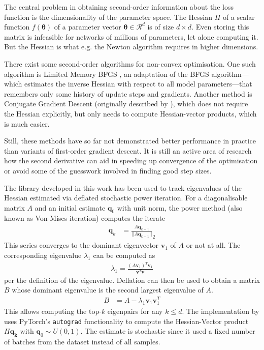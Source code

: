 The central problem in obtaining second-order information about the loss
function is the dimensionality of the parameter space. The Hessian $H$ of a
scalar function $f(\boldsymbol{\theta})$ of a parameter vector $\boldsymbol{\theta} \in
\mathcal{R}^d$ is of size $d\times d$. Even storing this matrix is infeasible
for networks of millions of parameters, let alone computing it.
But the Hessian is what e.g. the Newton algorithm requires in higher dimensions.

There exist some second-order algorithms for non-convex optimisation.  One such
algorithm is Limited Memory BFGS \citep{liu1989limited}, an adaptation of the
BFGS algorithm---which estimates the inverse Hessian with respect to all model
parameters---that remembers only some history of update steps and gradients.
Another method is Conjugate Gradient Descent (originally described by
\citet{fletcher1964function}), which does not require the Hessian explicitly,
but only needs to compute Hessian-vector products, which is much easier.

Still, these methods have so far not demonstrated better performance in practice than
variants of first-order gradient descent. It is still an active area of research
how the second derivative can aid in speeding up convergence of the optimisation
or avoid some of the guesswork involved in finding good step sizes.

The library developed in this work has been used to track eigenvalues of the
Hessian estimated via deflated stochastic power iteration. For a diagonalisable
matrix $A$ and an initial estimate $\mathbf{q}_0$ with unit norm, the power method
(also known as Von-Mises iteration) computes the iterate
\begin{align}
    \mathbf{q}_k &= \frac{A\mathbf{q}_{k-1}}{||A\mathbf{q}_{k-1}||}_2
\end{align}
This series converges to the dominant eigenvector $\mathbf{v}_1$ of $A$ or not at all.
The corresponding eigenvalue $\lambda_1$ can be computed as
\begin{align}
    \lambda_1 = \frac{\left(A\mathbf{v}_1\right)^T\mathbf{v}_1}{\mathbf{v}^T\mathbf{v}}
\end{align}
per the definition of the eigenvalue. Deflation can then be used to obtain a
matrix $B$ whose dominant eigenvalue is the second largest eigenvalue of $A$.
\begin{align}
    B &= A - \lambda_1 \mathbf{v}_1\mathbf{v}_1^T
\end{align}
This allows computing the top-$k$ eigenpairs for any $k \le d$. The implementation by
\citet{golmant2018} uses PyTorch's \texttt{autograd} functionality to compute
the Hessian-Vector product $H\mathbf{q_k}$ with $\mathbf{q}_0 \sim U(0,1)$. The
estimate is stochastic since it used a fixed number of batches from the dataset
instead of all samples.

